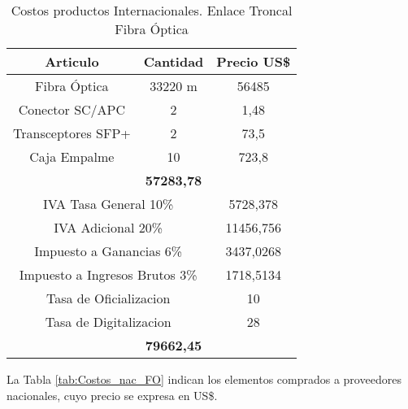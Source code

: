 \begin{table}[htbp]
  \centering
    \begin{tabular}{|c|c|c|}
    \hline
    \rowcolor[rgb]{ .773,  .851,  .945} \textbf{Articulo} & \textbf{Cantidad} & \textbf{Precio US\$} \bigstrut\\
    \hline
    \multicolumn{1}{|p{11.22em}|}{Fibra Óptica} & \multicolumn{1}{p{7.055em}|}{33220 m} & 56485 \bigstrut\\
    \hline
    \multicolumn{1}{|p{11.22em}|}{Conector SC/APC} & 2     & 1,48 \bigstrut\\
    \hline
    \multicolumn{1}{|p{11.22em}|}{Transceptores SFP+} & 2     & 73,5 \bigstrut\\
    \hline
    \multicolumn{1}{|p{11.22em}|}{Caja Empalme} & 10    & 723,8 \bigstrut\\
    \hline
    \rowcolor[rgb]{ .773,  .851,  .945} \multicolumn{2}{|c|}{\textbf{Costo}} & \textbf{57283,78} \bigstrut\\
    \hline
    \multicolumn{2}{|p{18.275em}|}{IVA Tasa General 10\%} & 5728,378 \bigstrut\\
    \hline
    \multicolumn{2}{|p{18.275em}|}{IVA Adicional 20\%} & 11456,756 \bigstrut\\
    \hline
    \multicolumn{2}{|p{18.275em}|}{Impuesto a Ganancias 6\%} & 3437,0268 \bigstrut\\
    \hline
    \multicolumn{2}{|p{18.275em}|}{Impuesto a Ingresos Brutos 3\%} & 1718,5134 \bigstrut\\
    \hline
    \multicolumn{2}{|p{18.275em}|}{Tasa de Oficializacion} & 10 \bigstrut\\
    \hline
    \multicolumn{2}{|p{18.275em}|}{Tasa de Digitalizacion} & 28 \bigstrut\\
    \hline
    \rowcolor[rgb]{ .773,  .851,  .945} \multicolumn{2}{|c|}{\textbf{Total}} & \textbf{79662,45} \bigstrut\\
    \hline
    \end{tabular}%
    \caption{Costos productos Internacionales. Enlace Troncal Fibra Óptica}
  \label{tab:Costos_int_FO}%
\end{table}%



La Tabla \ref{tab:Costos_nac_FO} indican los elementos comprados a proveedores nacionales, cuyo precio se expresa en US\$. 



